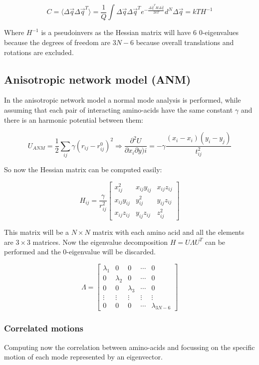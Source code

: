 		$$C = \langle\Delta\vec{q}\Delta\vec{q}^T\rangle = \frac{1}{Q}\int\Delta\vec{q}\Delta\vec{q}^Te^{-\frac{\Delta\vec{q}^TH\Delta\vec{q}}{2kT}}d^N\Delta\vec{q} = kTH^{-1}$$

		Where $H^{-1}$ is a pseudoinvers as the Hessian matrix will have $6$ $0$-eigenvalues because the degrees of freedom are $3N-6$ because overall translations and rotations are excluded.

	\subsection{Anisotropic network model (ANM)}
	In the anisotropic network model a normal mode analysis is performed, while assuming that each pair of interacting amino-acids have the same constant $\gamma$ and there is an harmonic potential between them:

	$$U_{ANM} = \frac{1}{2}\sum\limits_{ij}\gamma(r_{ij}-r_{ij}^0)^2\Rightarrow\frac{\partial^2 U}{\partial x_i\partial y)i} = -\gamma\frac{(x_i-x_i)(y_i-y_j)}{t_{ij}^2}$$

	So now the Hessian matrix can be computed easily:

	$$H_{ij} = \frac{\gamma}{r_{ij}^2}\begin{bmatrix}x_{ij}^2 & x_{ij}y_{ij} & x_{ij}z_{ij}\\x_{ij}y_{ij} & y_{ij}^2 & y_{ij}z_{ij}\\ x_{ij}z_{ij} & y_{ij}z_{ij} & z_{ij}^2\end{bmatrix}$$

	This matrix will be a $N\times N$ matrix with each amino acid and all the elements are $3\times 3$ matrices.
	Now the eigenvalue decomposition $H=U\Lambda U^T$ can be performed and the $0$-eigenvalue will be discarded.

	$$\Lambda = \begin{bmatrix}\lambda_1 & 0 & 0 & \cdots & 0\\ 0 & \lambda_2 & 0 & \cdots & 0\\ 0 & 0 & \lambda_3 & \cdots & 0\\\vdots & \vdots & \vdots & \vdots & \vdots\\ 0 & 0 & 0 & \cdots & \lambda_{3N-6}\end{bmatrix}$$

		\subsubsection{Correlated motions}
		Computing now the correlation between amino-acids and focussing on the specific motion of each mode represented by an eigenvector.

